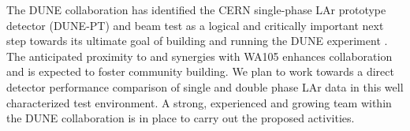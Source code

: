 The DUNE collaboration has identified the CERN single-phase LAr prototype detector (DUNE-PT) and beam test as a logical and critically important next
step towards its ultimate goal of building and running the DUNE experiment \cite{dunecdr}. The anticipated proximity to and synergies with WA105 enhances collaboration and is expected to foster community building. We plan to work towards a direct detector performance comparison of single and double phase LAr data in this well characterized test environment. 
%
A strong, experienced and growing team within the DUNE collaboration is in place to carry out the proposed activities.











